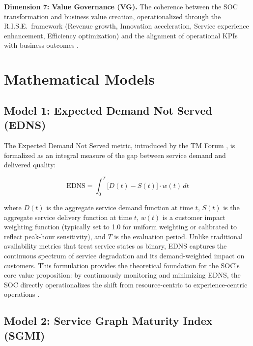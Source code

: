 \documentclass[12pt,a4paper]{article}
\begin{document}
\textbf{Dimension 7: Value Governance (VG).} The coherence between the SOC transformation and business value creation, operationalized through the R.I.S.E.\ framework (Revenue growth, Innovation acceleration, Service experience enhancement, Efficiency optimization) and the alignment of operational KPIs with business outcomes \citep{rust2014service,vargo2004evolving,primary2026a}.

\section{Mathematical Models}

\subsection{Model 1: Expected Demand Not Served (EDNS)}

The Expected Demand Not Served metric, introduced by the TM Forum \citep{tmforum2024c}, is formalized as an integral measure of the gap between service demand and delivered quality:

\begin{equation}
\text{EDNS} = \int_0^T \bigl[D(t) - S(t)\bigr] \cdot w(t)\, dt
\label{eq:edns}
\end{equation}

\noindent where $D(t)$ is the aggregate service demand function at time $t$, $S(t)$ is the aggregate service delivery function at time $t$, $w(t)$ is a customer impact weighting function (typically set to 1.0 for uniform weighting or calibrated to reflect peak-hour sensitivity), and $T$ is the evaluation period. Unlike traditional availability metrics that treat service states as binary, EDNS captures the continuous spectrum of service degradation and its demand-weighted impact on customers. This formulation provides the theoretical foundation for the SOC's core value proposition: by continuously monitoring and minimizing EDNS, the SOC directly operationalizes the shift from resource-centric to experience-centric operations \citep{orourke2019green,parasuraman1988servqual}.

\subsection{Model 2: Service Graph Maturity Index (SGMI)}
\end{document}
